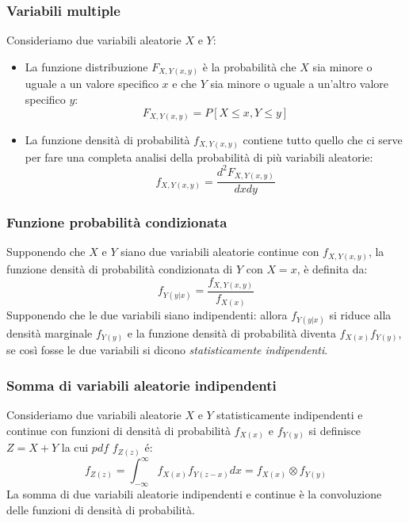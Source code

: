         \subsubsection{Variabili multiple}
            Consideriamo due variabili aleatorie $X$ e $Y$:
            \begin{itemize}
                \item {
                    La funzione distribuzione $F_{X,Y (x,y)}$ è la probabilità che $X$ sia minore o uguale a un valore specifico $x$ e che $Y$
                    sia minore o uguale a un'altro valore specifico $y$:
                    \[
                        F_{X,Y (x,y)} = P[X\leq x,Y\leq y]    
                    \]
                }
                \item {
                    La funzione densità di probabilità $f_{X,Y (x,y)}$ contiene tutto quello che ci serve per fare una completa analisi della probabilità
                    di più variabili aleatorie:
                    \[
                        f_{X,Y (x,y)} = \frac{d^2 F_{X,Y (x,y)}}{dxdy}     
                    \]

                }
            \end{itemize}
        \subsubsection{Funzione probabilità condizionata}
            Supponendo che $X$ e $Y$ siano due variabili aleatorie continue con $f_{X,Y (x,y)}$, la funzione densità di probabilità condizionata di $Y$ con $X=x$,
            è definita da:
            \[
                f_{Y (y|x)} = \frac{f_{X,Y (x,y)}}{f_{X(x)}}     
            \]
            Supponendo che le due variabili siano indipendenti: allora $f_{Y (y|x)}$ si riduce alla densità marginale $f_{Y (y)}$ e la funzione densità di
            probabilità diventa $f_{X (x)}f_{Y (y)}$, se così fosse le due variabili si dicono \emph{statisticamente indipendenti}.
        \subsubsection{Somma di variabili aleatorie indipendenti}
            Consideriamo due variabili aleatorie $X$ e $Y$ statisticamente indipendenti e continue con funzioni di densità di probabilità $f_{X (x)}$ e $f_{Y (y)}$ si 
            definisce $Z = X+Y$ la cui $pdf$ $f_{Z (z)}$ é:
            \[
                f_{Z (z)} = \int_{-\infty}^{\infty}f_{X (x)}f_{Y (z-x)} dx =  f_{X (x)} \otimes f_{Y (y)}
            \]
            La somma di due variabili aleatorie indipendenti e continue è la convoluzione delle funzioni di densità di probabilità.
